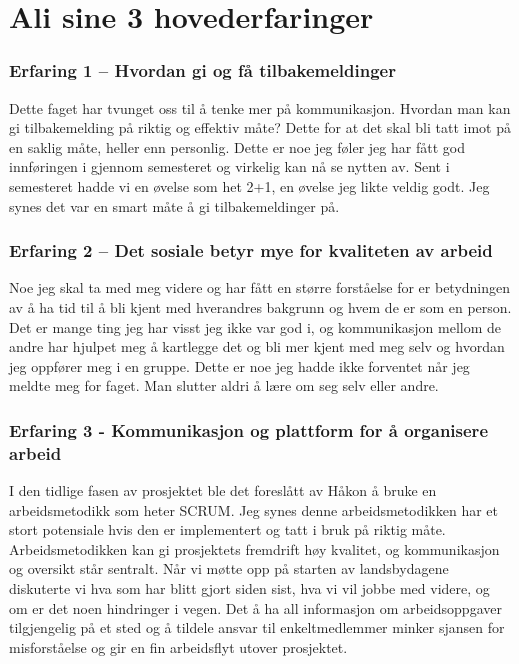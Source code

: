 \section{Ali sine 3 hovederfaringer}

\subsubsection*{Erfaring 1 –  Hvordan gi og få tilbakemeldinger} 
 Dette faget har tvunget oss til å tenke mer på kommunikasjon. Hvordan man kan gi tilbakemelding på riktig og effektiv måte? Dette for at det skal bli tatt imot på en saklig måte, heller enn personlig. Dette er noe jeg føler jeg har fått god innføringen i gjennom semesteret og virkelig kan nå se nytten av. Sent i semesteret hadde vi en øvelse som het 2+1, en øvelse  jeg likte veldig godt. Jeg synes  det var en smart måte å gi tilbakemeldinger på. 
 
\subsubsection*{Erfaring 2 – Det sosiale betyr mye for kvaliteten av arbeid}
Noe jeg skal ta med meg videre og har fått en større forståelse for er betydningen av å ha tid til å bli kjent med hverandres bakgrunn og hvem de er som en person. Det er mange ting jeg har visst jeg ikke var god i, og kommunikasjon mellom de andre har hjulpet meg å kartlegge det og bli mer kjent med meg selv og hvordan jeg oppfører meg i en gruppe. Dette er noe jeg hadde ikke forventet når jeg meldte meg for faget. Man slutter aldri å lære om seg selv eller andre. 
 
 
\subsubsection*{Erfaring 3 - Kommunikasjon og plattform for å organisere arbeid}
I den tidlige fasen av prosjektet ble det foreslått av Håkon å bruke en arbeidsmetodikk som heter SCRUM. Jeg synes denne arbeidsmetodikken har et stort potensiale hvis den er implementert og tatt i bruk på riktig måte. Arbeidsmetodikken kan gi prosjektets fremdrift høy kvalitet, og kommunikasjon og oversikt står sentralt. Når vi møtte opp på starten av landsbydagene diskuterte vi hva som har blitt gjort siden sist, hva vi vil jobbe med videre, og om er det noen hindringer i vegen. Det å ha all informasjon om arbeidsoppgaver tilgjengelig på et sted og å tildele ansvar til enkeltmedlemmer minker sjansen for misforståelse og gir en fin arbeidsflyt utover prosjektet. 

